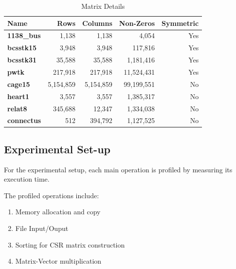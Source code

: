 \documentclass[conference]{IEEEtran}
\begin{document}
        \begin{table}[ht]
            \caption{Matrix Details}
            \label{tab:matrix_details}
            \centering
            \begin{adjustbox}{width=\columnwidth}
            \begin{tabular}{lrrrr}
            \toprule
            \textbf{Name} & \textbf{Rows} & \textbf{Columns} & \textbf{Non-Zeros} & \textbf{Symmetric} \\
            \midrule
                \textbf{1138\_bus} & 1,138 & 1,138 & 4,054 & Yes \\
                \textbf{bcsstk15} & 3,948 & 3,948 & 117,816 & Yes \\
                \textbf{bcsstk31} & 35,588 & 35,588 & 1,181,416 & Yes \\
                \textbf{pwtk} & 217,918 & 217,918 & 11,524,431 & Yes \\
                \textbf{cage15} & 5,154,859 & 5,154,859 & 99,199,551 & No \\
                \textbf{heart1} & 3,557 & 3,557 & 1,385,317 & No \\
                \textbf{relat8} & 345,688 & 12,347 & 1,334,038 & No \\
                \textbf{connectus} & 512 & 394,792 & 1,127,525 & No \\
            \bottomrule
            \end{tabular}
            \end{adjustbox}
        \end{table}

        \subsection{Experimental Set-up}

        For the experimental setup, each main operation is profiled by
        measuring its execution time.
        
        The profiled operations include:
        \begin{enumerate}
            \item Memory allocation and copy
            \item File Input/Ouput
            \item Sorting for CSR matrix construction
            \item Matrix-Vector multiplication
        \end{enumerate}
\end{document}
